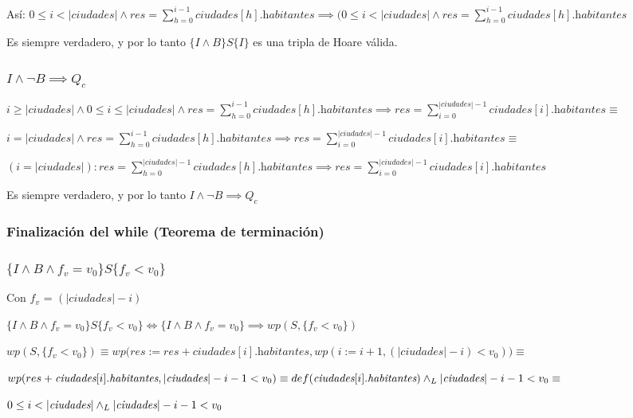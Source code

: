 \documentclass[10pt,a4paper]{article}
\newcommand{\ciu}{
\textit{ciudades}
}
\newcommand{\hab}{
\textit{habitantes}
}
\newcommand{\fvariante}{
    (|\ciu| - i)
}
\begin{document}
\vspace{3mm}

Así: $0 \leq i < |\textit{ciudades}| \land res = \sum_{h=0}^{i-1}\textit{ciudades}[h].\textit{habitantes} \implies (0\leq i<|\textit{ciudades}| \land res = \sum_{h=0}^{i-1}\textit{ciudades}[h].\textit{habitantes}$

\vspace{2mm}

Es siempre verdadero, y por lo tanto $\{I\land B\}S\{I\}$ es una tripla de Hoare válida. \checkmark


\subsubsection{\textbf{$I \land \lnot B \implies Q_c$}}

$
i\geq|\ciu|\land0\leq i\leq |\ciu| \land res = \sum_{h=0}^{i-1}\ciu[h].\hab \implies res = \sum_{i=0}^{|\ciu|-1}\ciu[i].\hab \equiv
$

$
i = |\ciu| \land res = \sum_{h=0}^{i-1}\ciu[h].\hab \implies res = \sum_{i=0}^{|\ciu|-1}\ciu[i].\hab \equiv
$

$
(i = |\ciu|): res = \sum_{h=0}^{|\ciu|-1}\ciu[h].\hab \implies res = \sum_{i=0}^{|\ciu|-1}\ciu[i].\hab
$
\vspace{2mm}

Es siempre verdadero, y por lo tanto $I \land \lnot B \implies Q_c$ \checkmark

\subsubsection*{Finalización del while (Teorema de terminación)}

\subsubsection{$\{I \land B \land f_v = v_0\} S \{f_v<v_0\}$}
Con $f_v$ = $\fvariante$

\vspace{2mm}

$\{I \land B \land f_v = v_0\} S \{f_v<v_0\} \iff \{I \land B \land f_v = v_0\} \implies wp(S,\{f_v<v_0\})$

$
wp(S,\{f_v<v_0\}) \equiv wp\Big(res := res + \ciu[i].\hab, wp(i := i+1, \fvariante < v_0)\Big) \equiv
$

$
wp(res+\ciu[i].\hab, |\ciu| - i - 1 < v_0) \equiv def(\ciu[i].\hab) \yLuego |\ciu|-i-1< v_0 \equiv
$

$
0 \leq i < |\ciu| \yLuego |\ciu|- i -1<v_0
$
\end{document}
